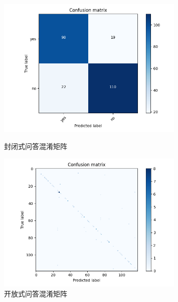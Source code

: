
\begin{figure}[htbp]
	\begin{minipage}{0.5\linewidth}
		\centering	
		\includegraphics[width=0.8\textwidth]{Fig/myfig/chapter3/close_confusionmatrix.png}  %
		\caption{\label{close_confusionmatrix}封闭式问答混淆矩阵} 	
	\end{minipage}
	\begin{minipage}{0.5\linewidth}
		\centering	
		\includegraphics[width=0.8\textwidth]{Fig/myfig/chapter3/open_confusionmatrix.png}  %
		\caption{\label{open_confusionmatrix}开放式问答混淆矩阵} 	
	\end{minipage}	
\end{figure}

